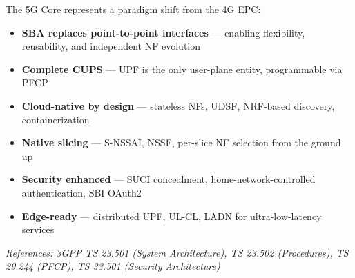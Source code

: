 
The 5G Core represents a paradigm shift from the 4G EPC:

\begin{itemize}
\tightlist
\item
  \textbf{SBA replaces point-to-point interfaces} — enabling flexibility, reusability, and independent NF evolution
\item
  \textbf{Complete CUPS} — UPF is the only user-plane entity, programmable via PFCP
\item
  \textbf{Cloud-native by design} — stateless NFs, UDSF, NRF-based discovery, containerization
\item
  \textbf{Native slicing} — S-NSSAI, NSSF, per-slice NF selection from the ground up
\item
  \textbf{Security enhanced} — SUCI concealment, home-network-controlled authentication, SBI OAuth2
\item
  \textbf{Edge-ready} — distributed UPF, UL-CL, LADN for ultra-low-latency services
\end{itemize}

\emph{References: 3GPP TS 23.501 (System Architecture), TS 23.502 (Procedures), TS 29.244 (PFCP), TS 33.501 (Security Architecture)}
